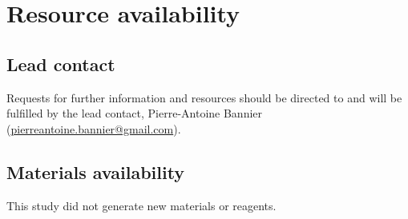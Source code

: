\section*{Resource availability}

\subsection*{Lead contact}
Requests for further information and resources should be directed to and will be
fulfilled by the lead contact, Pierre-Antoine Bannier
(\href{mailto:pierreantoine.bannier@gmail.com}{pierreantoine.bannier@gmail.com}).

\subsection*{Materials availability}
This study did not generate new materials or reagents.

